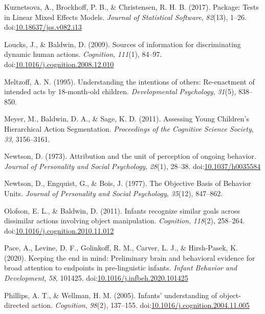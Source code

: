 \documentclass[
  english,
  man,floatsintext]{apa6}
\newlength{\cslhangindent}
\newenvironment{cslreferences}%
  {\setlength{\parindent}{0pt}%
  \everypar{\setlength{\hangindent}{\cslhangindent}}\ignorespaces}%
  {\par}
\begin{document}
\begin{cslreferences}
\leavevmode\hypertarget{ref-lmerTest}{}%
Kuznetsova, A., Brockhoff, P. B., \& Christensen, R. H. B. (2017). Package: Tests in Linear Mixed Effects Models. \emph{Journal of Statistical Software}, \emph{82}(13), 1--26. doi:\href{https://doi.org/10.18637/jss.v082.i13}{10.18637/jss.v082.i13}

\leavevmode\hypertarget{ref-loucks_baldwin_2009}{}%
Loucks, J., \& Baldwin, D. (2009). Sources of information for discriminating dynamic human actions. \emph{Cognition}, \emph{111}(1), 84--97. doi:\href{https://doi.org/10.1016/j.cognition.2008.12.010}{10.1016/j.cognition.2008.12.010}

\leavevmode\hypertarget{ref-meltzoff_1995}{}%
Meltzoff, A. N. (1995). Understanding the intentions of others: Re-enactment of intended acts by 18-month-old children. \emph{Developmental Psychology}, \emph{31}(5), 838--850.

\leavevmode\hypertarget{ref-meyer_2011}{}%
Meyer, M., Baldwin, D. A., \& Sage, K. D. (2011). Assessing Young Children's Hierarchical Action Segmentation. \emph{Proceedings of the Cognitive Science Society}, \emph{33}, 3156--3161.

\leavevmode\hypertarget{ref-newtson_1973}{}%
Newtson, D. (1973). Attribution and the unit of perception of ongoing behavior. \emph{Journal of Personality and Social Psychology}, \emph{28}(1), 28--38. doi:\href{https://doi.org/10.1037/h0035584}{10.1037/h0035584}

\leavevmode\hypertarget{ref-newtson_1977}{}%
Newtson, D., Engquist, G., \& Bois, J. (1977). The Objective Basis of Behavior Units. \emph{Journal of Personality and Social Psychology}, \emph{35}(12), 847--862.

\leavevmode\hypertarget{ref-olofson_baldwin_2011}{}%
Olofson, E. L., \& Baldwin, D. (2011). Infants recognize similar goals across dissimilar actions involving object manipulation. \emph{Cognition}, \emph{118}(2), 258--264. doi:\href{https://doi.org/10.1016/j.cognition.2010.11.012}{10.1016/j.cognition.2010.11.012}

\leavevmode\hypertarget{ref-pace_2020}{}%
Pace, A., Levine, D. F., Golinkoff, R. M., Carver, L. J., \& Hirsh-Pasek, K. (2020). Keeping the end in mind: Preliminary brain and behavioral evidence for broad attention to endpoints in pre-linguistic infants. \emph{Infant Behavior and Development}, \emph{58}, 101425. doi:\href{https://doi.org/10.1016/j.infbeh.2020.101425}{10.1016/j.infbeh.2020.101425}

\leavevmode\hypertarget{ref-phillips_wellman_2005}{}%
Phillips, A. T., \& Wellman, H. M. (2005). Infants' understanding of object-directed action. \emph{Cognition}, \emph{98}(2), 137--155. doi:\href{https://doi.org/10.1016/j.cognition.2004.11.005}{10.1016/j.cognition.2004.11.005}


\end{cslreferences}
\end{document}
